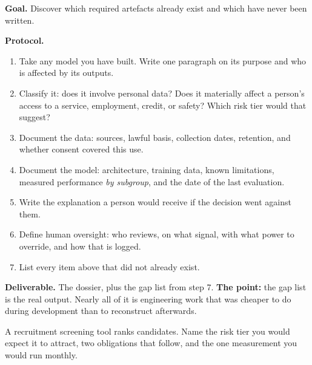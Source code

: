 \begin{practicallab}
\textbf{Goal.} Discover which required artefacts already exist and which have
never been written.

\textbf{Protocol.}
\begin{enumerate}
  \item Take any model you have built. Write one paragraph on its purpose and
        who is affected by its outputs.
  \item Classify it: does it involve personal data? Does it materially affect a
        person's access to a service, employment, credit, or safety? Which risk
        tier would that suggest?
  \item Document the data: sources, lawful basis, collection dates, retention,
        and whether consent covered this use.
  \item Document the model: architecture, training data, known limitations,
        measured performance \emph{by subgroup}, and the date of the last
        evaluation.
  \item Write the explanation a person would receive if the decision went
        against them.
  \item Define human oversight: who reviews, on what signal, with what power to
        override, and how that is logged.
  \item List every item above that did not already exist.
\end{enumerate}

\textbf{Deliverable.} The dossier, plus the gap list from step 7.
\textbf{The point:} the gap list is the real output. Nearly all of it is
engineering work that was cheaper to do during development than to reconstruct
afterwards.
\end{practicallab}

\begin{checkpoint}
A recruitment screening tool ranks candidates. Name the risk tier you would
expect it to attract, two obligations that follow, and the one measurement you
would run monthly.
\end{checkpoint}

